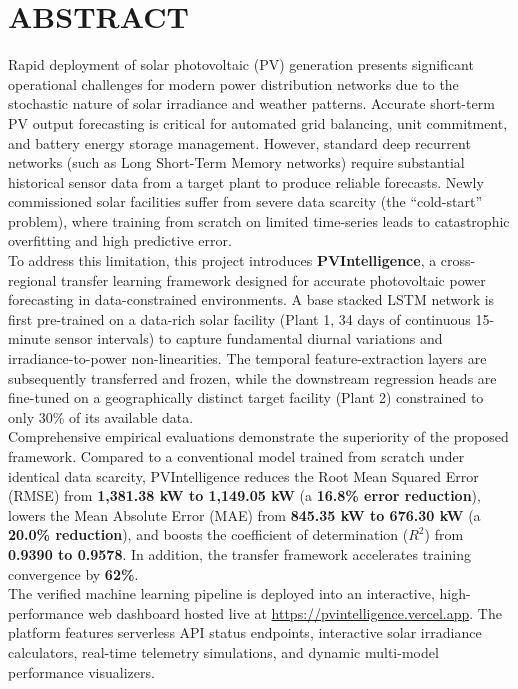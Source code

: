 \documentclass[12pt,a4paper,oneside]{report}
\begin{document}
\chapter*{ABSTRACT}

Rapid deployment of solar photovoltaic (PV) generation presents significant operational challenges for modern power distribution networks due to the stochastic nature of solar irradiance and weather patterns. Accurate short-term PV output forecasting is critical for automated grid balancing, unit commitment, and battery energy storage management. However, standard deep recurrent networks (such as Long Short-Term Memory networks) require substantial historical sensor data from a target plant to produce reliable forecasts. Newly commissioned solar facilities suffer from severe data scarcity (the ``cold-start'' problem), where training from scratch on limited time-series leads to catastrophic overfitting and high predictive error.\\[0.4cm]

\noindent To address this limitation, this project introduces \textbf{PVIntelligence}, a cross-regional transfer learning framework designed for accurate photovoltaic power forecasting in data-constrained environments. A base stacked LSTM network is first pre-trained on a data-rich solar facility (Plant 1, 34 days of continuous 15-minute sensor intervals) to capture fundamental diurnal variations and irradiance-to-power non-linearities. The temporal feature-extraction layers are subsequently transferred and frozen, while the downstream regression heads are fine-tuned on a geographically distinct target facility (Plant 2) constrained to only 30\% of its available data.\\[0.4cm]

\noindent Comprehensive empirical evaluations demonstrate the superiority of the proposed framework. Compared to a conventional model trained from scratch under identical data scarcity, PVIntelligence reduces the Root Mean Squared Error (RMSE) from \textbf{1,381.38 kW to 1,149.05 kW} (a \textbf{16.8\% error reduction}), lowers the Mean Absolute Error (MAE) from \textbf{845.35 kW to 676.30 kW} (a \textbf{20.0\% reduction}), and boosts the coefficient of determination ($R^2$) from \textbf{0.9390 to 0.9578}. In addition, the transfer framework accelerates training convergence by \textbf{62\%}.\\[0.4cm]

\noindent The verified machine learning pipeline is deployed into an interactive, high-performance web dashboard hosted live at \url{https://pvintelligence.vercel.app}. The platform features serverless API status endpoints, interactive solar irradiance calculators, real-time telemetry simulations, and dynamic multi-model performance visualizers.\\[0.6cm]
\end{document}
